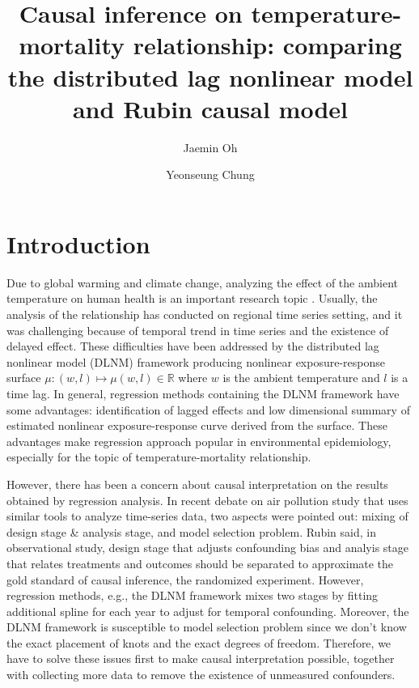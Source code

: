 \documentclass[12pt]{article}
\author[1]{Jaemin Oh}
\author[2]{Yeonseung Chung}
\affil[1,2]{Department of Mathematical Sciences, 
KAIST, Daejeon, South Korea}
\title{
	Causal inference on temperature-mortality relationship: 
	comparing the distributed lag nonlinear model and Rubin causal model
	} %
\begin{document}
\maketitle



\section{Introduction}

Due to global warming and climate change,
analyzing the effect of the ambient temperature on human health is an important research topic
\cite{gasparrini2015, yoonhee2019, temperaturemorbidity}.
Usually, the analysis of the relationship has conducted on regional time series setting,
and it was challenging because of temporal trend in time series and the existence of delayed effect.
These difficulties have been addressed by 
the distributed lag nonlinear model (DLNM) framework\cite{dlnm2010}
producing nonlinear exposure-response surface
$\mu : (w, l) \mapsto \mu(w,l) \in \mathbb{R}$ where $w$ is the ambient temperature and $l$ is a time lag.
In general, regression methods containing the DLNM framework have some advantages:
identification of lagged effects and
low dimensional summary of estimated nonlinear exposure-response curve derived from the surface.
These advantages make regression approach popular in environmental epidemiology,
especially for the topic of temperature-mortality relationship.

However, there has been a concern about causal interpretation 
on the results obtained by regression analysis.
In recent debate on air pollution study\cite{dominici2019sci} 
that uses similar tools to analyze time-series data,
two aspects were pointed out:
mixing of design stage \& analysis stage, and model selection problem.
Rubin said, in observational study,
design stage that adjusts confounding bias and analyis stage that relates treatments and outcomes
should be separated to approximate the gold standard of causal inference, 
the randomized experiment\cite{rubin2007sim}.
However, regression methods, e.g., the DLNM framework mixes two stages
by fitting additional spline for each year to adjust for temporal confounding.
Moreover, the DLNM framework is susceptible to model selection problem\cite{gasparrini2016}
since we don't know the exact placement of knots and the exact degrees of freedom.
Therefore, we have to solve these issues first to make causal interpretation possible,
together with collecting more data to remove the existence of unmeasured confounders.
\end{document}
